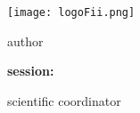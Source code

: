 \begin{titlepage}
    \begin{center}
        \large
        \MakeUppercase{\university}
        
        \LARGE
        \textbf{\MakeUppercase{\faculty}}
        
        \vspace{1cm}
        \texttt{[image: logoFii.png]}
        
        \vspace{1cm}
        \Large
        \MakeUppercase{\thesistype}
        
        \vspace{0.5cm}
        \LARGE
        \textbf{\thesistitle}
        
        \vspace{2cm}
        \Large
        author
        
        \vspace{0.5cm}
        \LARGE
        \textbf{\authornamefl}
        
        \vfill
        \Large
        \textbf{session:} \session
        
        \vspace{2cm}
        \Large
        scientific coordinator
        
        \vspace{0.5cm}
        \LARGE
        \textbf{\coordinator}
    \end{center}
\end{titlepage}